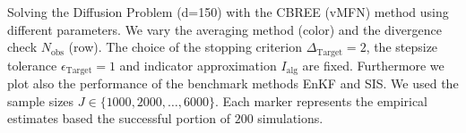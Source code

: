 Solving the Diffusion Problem (d=150) with the CBREE (vMFN) method using  different parameters. We vary the averaging method (color) and the divergence check $N_\text{obs}$ (row). The choice of the stopping criterion $\Delta_{\text{Target}} = 2$, the stepsize tolerance $\epsilon_{\text{Target}}=1$ and indicator approximation $I_\text{alg}$ are fixed. Furthermore we plot also the performance of the benchmark methods EnKF and SIS.  We used the sample sizes $J \in \{1000, 2000, \ldots, 6000\}$. Each marker represents the empirical estimates based the successful portion of $200$ simulations.